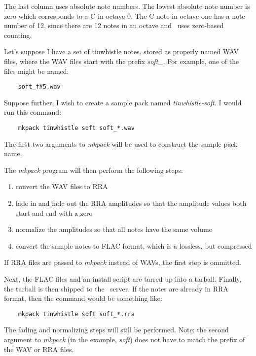 \documentclass{article}
\begin{document}
The last column uses absolute note numbers. The lowest absolute note number
is zero which corresponds to a C in octave 0. The C note in octave one
has a note number of 12, since there are 12 notes in an octave and \songlib\
uses zero-based counting.

Let's suppose I have a set of tinwhistle notes, stored as properly named
{\sc WAV} files, where the {\sc WAV} files start with the prefix {\it soft\_}.
For example, one of the files might be named:

\begin{verbatim}
    soft_f#5.wav
\end{verbatim}

Suppose further, I wish to create a sample pack named {\it tinwhistle-soft}.
I would run this command:

\begin{verbatim}
    mkpack tinwhistle soft soft_*.wav
\end{verbatim}

The first two arguments to {\it mkpack} will be used to construct the sample
pack name.

The {\it mkpack} program will then perform the following steps:

\begin{enumerate}
\item
        convert the {\sc WAV} files to {\sc RRA}
\item
        fade in and fade out the {\sc RRA} amplitudes so that the
        amplitude values both start and end with a zero
\item
        normalize the amplitudes so that all notes have the same volume
\item
        convert the sample notes to FLAC format, which is a lossless, but
        compressed
\end{enumerate}

If {\sc RRA} files are passed to {\it mkpack} instead of {\sc WAV}s, the first step is ommitted.

Next, the FLAC files and an install script are tarred up
into a tarball.
Finally, the tarball is then shipped to the \songlib\ server.
If the notes are already in {\sc RRA} format, then the command would be
something like:

\begin{verbatim}
    mkpack tinwhistle soft soft_*.rra
\end{verbatim}

The fading and normalizing steps will still be performed.
Note: the second argument to {\it mkpack} (in the example, {\it soft})
does not have to match the prefix of the {\sc WAV} or {\sc RRA} files.
\end{document}

